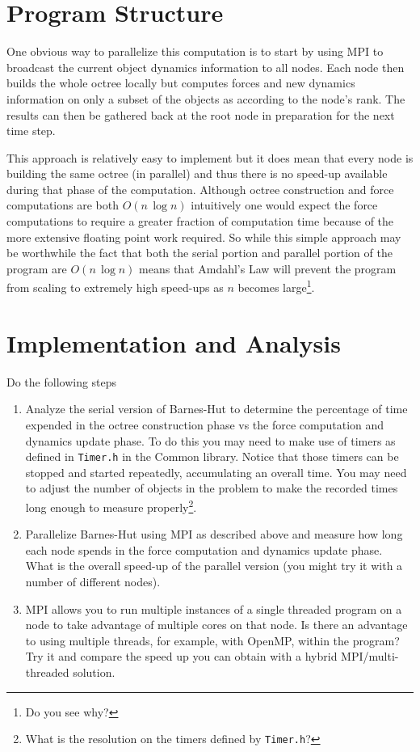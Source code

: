 \documentclass{article}
\begin{document}
\section{Program Structure}
\label{sec:program-structure}

One obvious way to parallelize this computation is to start by using MPI to broadcast the
current object dynamics information to all nodes. Each node then builds the whole octree locally
but computes forces and new dynamics information on only a subset of the objects as according to
the node's rank. The results can then be gathered back at the root node in preparation for the
next time step.

This approach is relatively easy to implement but it does mean that every node is building the
same octree (in parallel) and thus there is no speed-up available during that phase of the
computation. Although octree construction and force computations are both $O(n\,\log n)$
intuitively one would expect the force computations to require a greater fraction of
computation time because of the more extensive floating point work required. So while this
simple approach may be worthwhile the fact that both the serial portion and parallel portion of
the program are $O(n\,\log n)$ means that Amdahl's Law will prevent the program from scaling to
extremely high speed-ups as $n$ becomes large\footnote{Do you see why?}.

\section{Implementation and Analysis}
\label{sec:implementation-analysis}

Do the following steps
\begin{enumerate}
\item Analyze the serial version of Barnes-Hut to determine the percentage of time expended in
  the octree construction phase vs the force computation and dynamics update phase. To do this
  you may need to make use of timers as defined in \texttt{Timer.h} in the Common library.
  Notice that those timers can be stopped and started repeatedly, accumulating an overall time.
  You may need to adjust the number of objects in the problem to make the recorded times long
  enough to measure properly\footnote{What is the resolution on the timers defined by
    \texttt{Timer.h}?}.

\item Parallelize Barnes-Hut using MPI as described above and measure how long each node spends
  in the force computation and dynamics update phase. What is the overall speed-up of the
  parallel version (you might try it with a number of different nodes).

\item MPI allows you to run multiple instances of a single threaded program on a node to take
  advantage of multiple cores on that node. Is there an advantage to using multiple threads, for
  example, with OpenMP, within the program? Try it and compare the speed up you can obtain with
  a hybrid MPI/multi-threaded solution.
\end{enumerate}
\end{document}
